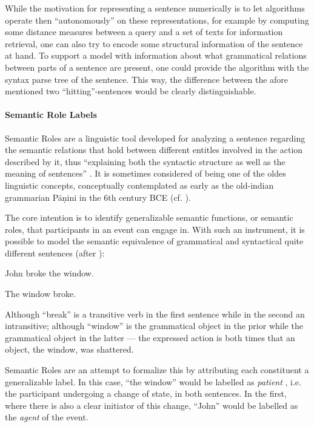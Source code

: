 While the motivation for representing a sentence numerically is to let algorithms operate
then ``autonomously'' on these representations, for example by computing some distance measures
between a query and a set of texts for information retrieval, one can also try to encode
some structural information of the sentence at hand.
To support a model with information about what grammatical relations between
parts of a sentence are present, one could provide the algorithm with the syntax parse
tree of the sentence. This way, the difference between the afore mentioned
two ``hitting''-sentences would be clearly distinguishable.

\paragraph*{Semantic Role Labels}

Semantic Roles are a linguistic tool developed for analyzing a sentence regarding
the semantic relations that hold between different entitles involved in the action
described by it, thus ``explaining both the syntactic structure as well as the meaning
of sentences'' \cite{bussmann2006routledge}. It is sometimes considered of being one
of the oldes linguistic concepts, conceptually contemplated as early as the old-indian
grammarian P\=a\d{n}ini in the 6th century BCE (cf. \citep{gildea2002automatic}).

The core intention is to identify generalizable semantic functions, or semantic roles,
that participants in an event can engage in. With such an instrument, it is possible to
model the semantic equivalence of grammatical and syntactical quite different sentences
(after \cite{palmer2010semantic}):

\begin{examples}
  \item John broke the window.
  \item The window broke.
\end{examples}

Although ``break'' is a transitive verb in the first sentence while in the second
an intransitive; although ``window'' is the grammatical object in the prior while
the grammatical object in the latter --- the expressed action is both times that
an object, the window, was shattered.

Semantic Roles are an attempt to formalize this by attributing each constituent
a generalizable label. In this case, ``the window'' would be labelled as \emph{patient}
, i.e. the participant undergoing a change of state, in both sentences.
In the first, where there is also a clear initiator of this change, ``John''
would be labelled as the \emph{agent} of the event.

